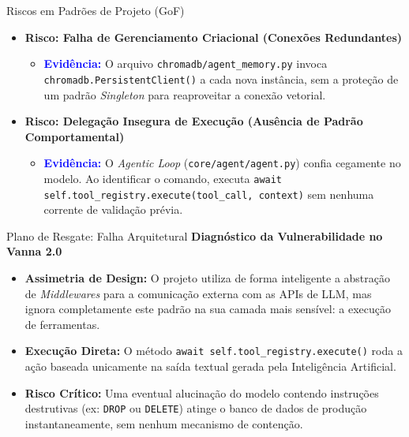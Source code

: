 \documentclass[10pt, aspectratio=169]{beamer}
\begin{document}
\begin{frame}{Riscos em Padrões de Projeto (GoF)}
    \begin{itemize}
        \item \textbf{Risco: Falha de Gerenciamento Criacional (Conexões Redundantes)}
        \begin{itemize}
            \item \textcolor{blue}{\textbf{Evidência:}} O arquivo \texttt{chromadb/agent\_memory.py} invoca \texttt{chromadb.PersistentClient()} a cada nova instância, sem a proteção de um padrão \textit{Singleton} para reaproveitar a conexão vetorial.
        \end{itemize}
        \vspace{0.3cm}

        \item \textbf{Risco: Delegação Insegura de Execução (Ausência de Padrão Comportamental)}
        \begin{itemize}
            \item \textcolor{blue}{\textbf{Evidência:}} O \textit{Agentic Loop} (\texttt{core/agent/agent.py}) confia cegamente no modelo. Ao identificar o comando, executa \texttt{await self.tool\_registry.execute(tool\_call, context)} sem nenhuma corrente de validação prévia.
        \end{itemize}
    \end{itemize}
\end{frame}

\begin{frame}{Plano de Resgate: Falha Arquitetural}
    \textbf{Diagnóstico da Vulnerabilidade no Vanna 2.0}
    \vspace{0.3cm}
    \begin{itemize}
        \item \textbf{Assimetria de Design:} O projeto utiliza de forma inteligente a abstração de \textit{Middlewares} para a comunicação externa com as APIs de LLM, mas ignora completamente este padrão na sua camada mais sensível: a execução de ferramentas.
        \item \textbf{Execução Direta:} O método \texttt{await self.tool\_registry.execute()} roda a ação baseada unicamente na saída textual gerada pela Inteligência Artificial.
        \item \textbf{Risco Crítico:} Uma eventual alucinação do modelo contendo instruções destrutivas (ex: \texttt{DROP} ou \texttt{DELETE}) atinge o banco de dados de produção instantaneamente, sem nenhum mecanismo de contenção.
    \end{itemize}
\end{frame}
\end{document}
